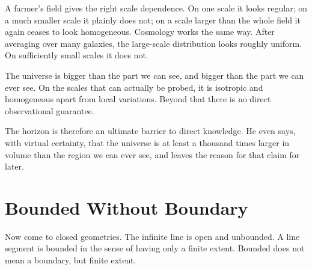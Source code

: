 A farmer's field gives the right scale dependence. On one scale it looks regular; on a much smaller scale it plainly does not; on a scale larger than the whole field it again ceases to look homogeneous. Cosmology works the same way. After averaging over many galaxies, the large-scale distribution looks roughly uniform. On sufficiently small scales it does not.

The universe is bigger than the part we can see, and bigger than the part we can ever see. On the scales that can actually be probed, it is isotropic and homogeneous apart from local variations. Beyond that there is no direct observational guarantee.

\begin{classroomqa}
\end{classroomqa}

\begin{classroomqa}
\end{classroomqa}

The horizon is therefore an ultimate barrier to direct knowledge. He even says, with virtual certainty, that the universe is at least a thousand times larger in volume than the region we can ever see, and leaves the reason for that claim for later.

\section{Bounded Without Boundary}

Now come to closed geometries. The infinite line is open and unbounded. A line segment is bounded in the sense of having only a finite extent. Bounded does not mean a boundary, but finite extent.

